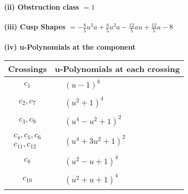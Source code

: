 \documentclass[1p]{elsarticle_modified}
\theoremstyle{definition}
\begin{document}
\flushleft \textbf{(ii) Obstruction class $= 1$}\\~\\
\flushleft \textbf{(iii) Cusp Shapes $= -\frac{8}{5} u^3 a+\frac{8}{5} u^2 a-\frac{12}{5} a u+\frac{12}{5} a-8$}\\~\\
\newpage\renewcommand{\arraystretch}{1}
\flushleft \textbf{(iv) u-Polynomials at the component}\newline \\
\begin{tabular}{m{50pt}|m{274pt}}
Crossings & \hspace{64pt}u-Polynomials at each crossing \\
\hline $$\begin{aligned}c_{1}\end{aligned}$$&$\begin{aligned}
&(u-1)^8
\end{aligned}$\\
\hline $$\begin{aligned}c_{2},c_{7}\end{aligned}$$&$\begin{aligned}
&(u^2+1)^4
\end{aligned}$\\
\hline $$\begin{aligned}c_{3},c_{9}\end{aligned}$$&$\begin{aligned}
&(u^4- u^2+1)^2
\end{aligned}$\\
\hline $$\begin{aligned}c_{4},c_{5},c_{6}\\c_{11},c_{12}\end{aligned}$$&$\begin{aligned}
&(u^4+3 u^2+1)^2
\end{aligned}$\\
\hline $$\begin{aligned}c_{8}\end{aligned}$$&$\begin{aligned}
&(u^2- u+1)^4
\end{aligned}$\\
\hline $$\begin{aligned}c_{10}\end{aligned}$$&$\begin{aligned}
&(u^2+u+1)^4
\end{aligned}$\\
\hline
\end{tabular}\\~\\
\end{document}

